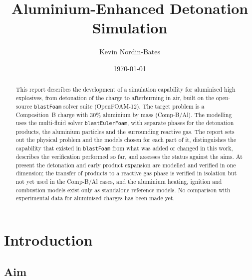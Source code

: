 \documentclass{article}
\title{\textbf{Aluminium-Enhanced Detonation Simulation}}
\author{Kevin Nordin-Bates}
\date{\today}
\begin{document}
\maketitle

\begin{abstract}
This report describes the development of a simulation capability for aluminised high explosives, from detonation of the charge to afterburning in air, built on the open-source \texttt{blastFoam} solver suite (OpenFOAM-12). The target problem is a Composition~B charge with 30\% aluminium by mass (Comp-B/Al). The modelling uses the multi-fluid solver \texttt{blastEulerFoam}, with separate phases for the detonation products, the aluminium particles and the surrounding reactive gas. The report sets out the physical problem and the models chosen for each part of it, distinguishes the capability that existed in \texttt{blastFoam} from what was added or changed in this work, describes the verification performed so far, and assesses the status against the aims. At present the detonation and early product expansion are modelled and verified in one dimension; the transfer of products to a reactive gas phase is verified in isolation but not yet used in the Comp-B/Al cases, and the aluminium heating, ignition and combustion models exist only as standalone reference models. No comparison with experimental data for aluminised charges has been made yet.
\end{abstract}

\tableofcontents

\section{Introduction}
\label{sec:intro}

\subsection{Aim}
\end{document}
